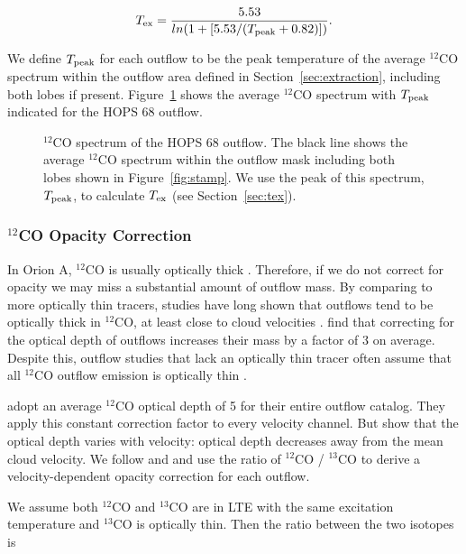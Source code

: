 \documentclass[twocolumn]{aastex63}
\newcommand{\example}{HOPS 68}
\newcommand{\tex}{$T_{\rm ex}$}
\newcommand{\co}[1][]{\ensuremath{^{#1}}CO}
\begin{document}
\begin{equation}\label{eq:Tex}
T_{\rm ex} = \frac{5.53}{ln(1 + [5.53/(T_{\rm peak} + 0.82)])}.
\end{equation}

We define $T_{\rm peak}$ for each outflow to be the peak temperature of the average $^{12}$CO spectrum within the outflow area defined in Section~\ref{sec:extraction}, including both lobes if present. Figure~\ref{fig:tex} shows the average $^{12}$CO spectrum with $T_{\rm peak}$ indicated for the \example{} outflow.

\begin{figure}
\caption{\co[12]{} spectrum of the \example{} outflow. The black line shows the average \co[12]{} spectrum within the outflow mask including both lobes shown in Figure~\ref{fig:stamp}. We use the peak of this spectrum, $T_{\rm peak}$, to calculate \tex{} (see Section~\ref{sec:tex}). \label{fig:tex}}
\end{figure}


\subsubsection{$^{12}$CO Opacity Correction}\label{sec:opacity}
In Orion A, \co[12]{} is usually optically thick \citep{Kong18}. Therefore, if we do not correct for opacity we may miss a substantial amount of outflow mass. By comparing to more optically thin tracers, studies have long shown that outflows tend to be optically thick in \co[12]{}, at least close to cloud velocities \citep[e.g.,][]{Goldsmith84,Arce01}. \citet{Dunham14} find that correcting for the optical depth of outflows increases their mass by a factor of 3 on average. Despite this, outflow studies that lack an optically thin tracer often assume that all \co[12]{} outflow emission is optically thin \citep[e.g. in Orion,][]{Morgan91,Takahashi08}. 

\citet{Tanabe:submitted} adopt an average \co[12]{} optical depth of 5 for their entire outflow catalog. They apply this constant correction factor to every velocity channel. But \citet{Dunham14} show that the optical depth varies with velocity: optical depth decreases away from the mean cloud velocity. We follow \citet{Dunham14} and \citet{ZhangY16} and use the ratio of $^{12}$CO / $^{13}$CO to derive a velocity-dependent opacity correction for each outflow.

We assume both \co[12]{} and \co[13]{} are in LTE with the same excitation temperature and \co[13]{} is optically thin. Then the ratio between the two isotopes is
\end{document}
